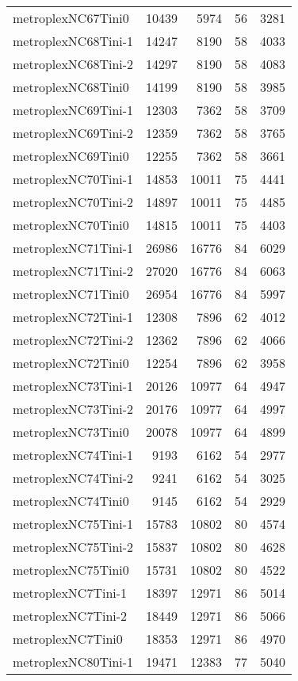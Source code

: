 \begin{longtable}{lrrrr}
metroplexNC67Tini0 & 10439 & 5974 & 56 & 3281 \\
metroplexNC68Tini-1 & 14247 & 8190 & 58 & 4033 \\
metroplexNC68Tini-2 & 14297 & 8190 & 58 & 4083 \\
metroplexNC68Tini0 & 14199 & 8190 & 58 & 3985 \\
metroplexNC69Tini-1 & 12303 & 7362 & 58 & 3709 \\
metroplexNC69Tini-2 & 12359 & 7362 & 58 & 3765 \\
metroplexNC69Tini0 & 12255 & 7362 & 58 & 3661 \\
metroplexNC70Tini-1 & 14853 & 10011 & 75 & 4441 \\
metroplexNC70Tini-2 & 14897 & 10011 & 75 & 4485 \\
metroplexNC70Tini0 & 14815 & 10011 & 75 & 4403 \\
metroplexNC71Tini-1 & 26986 & 16776 & 84 & 6029 \\
metroplexNC71Tini-2 & 27020 & 16776 & 84 & 6063 \\
metroplexNC71Tini0 & 26954 & 16776 & 84 & 5997 \\
metroplexNC72Tini-1 & 12308 & 7896 & 62 & 4012 \\
metroplexNC72Tini-2 & 12362 & 7896 & 62 & 4066 \\
metroplexNC72Tini0 & 12254 & 7896 & 62 & 3958 \\
metroplexNC73Tini-1 & 20126 & 10977 & 64 & 4947 \\
metroplexNC73Tini-2 & 20176 & 10977 & 64 & 4997 \\
metroplexNC73Tini0 & 20078 & 10977 & 64 & 4899 \\
metroplexNC74Tini-1 & 9193 & 6162 & 54 & 2977 \\
metroplexNC74Tini-2 & 9241 & 6162 & 54 & 3025 \\
metroplexNC74Tini0 & 9145 & 6162 & 54 & 2929 \\
metroplexNC75Tini-1 & 15783 & 10802 & 80 & 4574 \\
metroplexNC75Tini-2 & 15837 & 10802 & 80 & 4628 \\
metroplexNC75Tini0 & 15731 & 10802 & 80 & 4522 \\
metroplexNC7Tini-1 & 18397 & 12971 & 86 & 5014 \\
metroplexNC7Tini-2 & 18449 & 12971 & 86 & 5066 \\
metroplexNC7Tini0 & 18353 & 12971 & 86 & 4970 \\
metroplexNC80Tini-1 & 19471 & 12383 & 77 & 5040 \\

\end{longtable}
